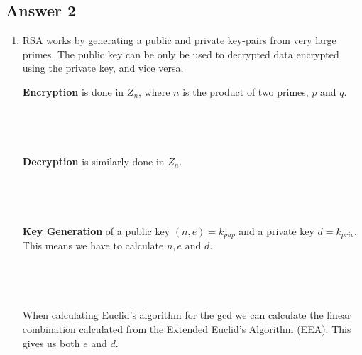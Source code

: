 \documentclass{article}
\begin{document}
	\subsection*{Answer 2}
	\renewcommand{\theenumi}{\alph{enumi}}
	\renewcommand{\theenumii}{\roman{enumii}}
	\begin{enumerate}
		\item RSA works by generating a public and private key-pairs from very large primes. The public key can be only be used to decrypted data encrypted using the private key, and vice versa. 
		
		\textbf{Encryption} is done in $Z_n$, where $n$ is the product of two primes, $p$ and $q$.
		\\
		\\
		\\
		\\
		\\
		\textbf{Decryption} is similarly done in $Z_n$.
		\\
		\\
		\\
		\\
		\\
		\textbf{Key Generation} of a public key $(n,e) = k_{pup}$ and a private key $d = k_{priv}$. This means we have to calculate $n,e \text{ and }d$.
		\\
		\\
		\\
		\\
		\\
		When calculating Euclid's algorithm for the gcd we can calculate the linear combination calculated from the Extended Euclid's Algorithm (EEA). This gives us both $e$ and $d$.
		

\end{enumerate}
\end{document}
